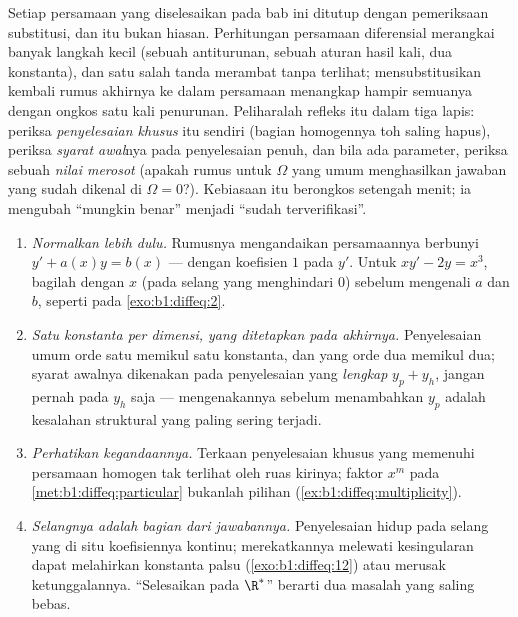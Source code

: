 \begin{remark}\label{rem:b1:diffeq:check}
Setiap persamaan yang diselesaikan pada bab ini ditutup dengan pemeriksaan
substitusi, dan itu bukan hiasan. Perhitungan persamaan
diferensial merangkai banyak langkah kecil (sebuah antiturunan, sebuah aturan hasil kali,
dua konstanta), dan satu salah tanda merambat tanpa terlihat;
mensubstitusikan kembali rumus akhirnya ke dalam persamaan menangkap
hampir semuanya dengan ongkos satu kali penurunan.
Peliharalah refleks itu dalam tiga lapis: periksa \emph{penyelesaian
khusus} itu sendiri (bagian homogennya toh saling hapus), periksa
\emph{syarat awal}nya pada penyelesaian penuh, dan bila ada
parameter, periksa sebuah \emph{nilai merosot} (apakah
rumus untuk $\Omega$ yang umum menghasilkan jawaban yang sudah dikenal di
$\Omega = 0$?). Kebiasaan itu berongkos setengah menit; ia mengubah
``mungkin benar'' menjadi ``sudah terverifikasi''.
\end{remark}

\begin{remark}\label{rem:b1:diffeq:pitfalls}
\begin{enumerate}
  \item \emph{Normalkan lebih dulu.} Rumusnya mengandaikan persamaannya
        berbunyi $y' + a(x)y = b(x)$ --- dengan koefisien $1$ pada $y'$.
        Untuk $xy' - 2y = x^3$, bagilah dengan $x$ (pada selang
        yang menghindari $0$) sebelum mengenali $a$ dan $b$, seperti pada
        \cref{exo:b1:diffeq:2}.
  \item \emph{Satu konstanta per dimensi, yang ditetapkan pada akhirnya.} Penyelesaian
        umum orde satu memikul satu konstanta, dan yang orde
        dua memikul dua; syarat awalnya dikenakan pada
        penyelesaian yang \emph{lengkap} $y_p + y_h$, jangan pernah pada $y_h$
        saja --- mengenakannya sebelum menambahkan $y_p$ adalah kesalahan
        struktural yang paling sering terjadi.
  \item \emph{Perhatikan kegandaannya.} Terkaan penyelesaian khusus
        yang memenuhi persamaan homogen tak terlihat oleh
        ruas kirinya; faktor $x^m$ pada
        \cref{met:b1:diffeq:particular} bukanlah pilihan
        (\cref{ex:b1:diffeq:multiplicity}).
  \item \emph{Selangnya adalah bagian dari jawabannya.} Penyelesaian hidup
        pada selang yang di situ koefisiennya kontinu;
        merekatkannya melewati kesingularan dapat melahirkan konstanta palsu
        (\cref{exo:b1:diffeq:12}) atau merusak ketunggalannya. ``Selesaikan
        pada $\R^*$'' berarti dua masalah yang saling bebas.
\end{enumerate}
\end{remark}

